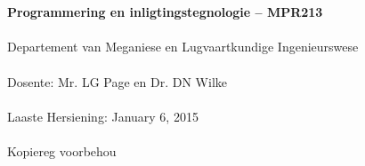 \begin{titlepage}
    \thispagestyle{empty}
    \\~\\[18cm]
    \large
    \textbf{Programmering en inligtingstegnologie -- MPR213} \\~\\
    Departement van Meganiese en Lugvaartkundige Ingenieurswese \\~\\[0.5cm]
    \normalsize
    Dosente: Mr. LG Page en  Dr. DN Wilke \\~\\
    Laaste Hersiening: January 6, 2015 \\~\\[0.5em]
    \textcopyright \quad Kopiereg voorbehou \\~\\
\end{titlepage}
\restoregeometry
